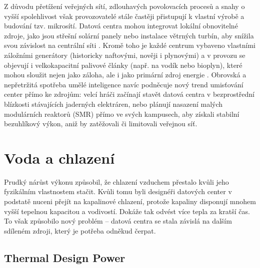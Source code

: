 Z důvodu přetížení veřejných sítí, zdlouhavých povolovacích procesů a snahy o vyšší spolehlivost však provozovatelé stále častěji přistupují k vlastní výrobě a budování tzv. mikrosítí. Datová centra mohou integrovat lokální obnovitelné zdroje, jako jsou střešní solární panely nebo instalace větrných turbín, aby snížila svou závislost na centrální síti \cite[91--93]{barroso_data_2026}. Kromě toho je každé centrum vybaveno vlastními záložními generátory (historicky naftovými, nověji i plynovými) a v provozu se objevují i velkokapacitní palivové články (např. na vodík nebo bioplyn), které mohou sloužit nejen jako záloha, ale i jako primární zdroj energie \cite{chen_electricity_2025}. Obrovská a nepřetržitá spotřeba umělé inteligence navíc podněcuje nový trend umisťování center přímo ke zdrojům: velcí hráči začínají stavět datová centra v bezprostřední blízkosti stávajících jaderných elektráren, nebo plánují nasazení malých modulárních reaktorů (SMR) přímo ve svých kampusech, aby získali stabilní bezuhlíkový výkon, aniž by zatěžovali či limitovali veřejnou síť. \cite{chen_electricity_2025, cruzes_data_2025, iea_energy_2025}


\section{Voda a chlazení}
\label{sec:chlazeni}


Prudký nárůst výkonu způsobil, že chlazení vzduchem přestalo kvůli jeho fyzikálním vlastnostem stačit. Kvůli tomu byli designéři datových center v podstatě nuceni přejít na kapalinové chlazení, protože kapaliny disponují mnohem vyšší tepelnou kapacitou a vodivostí. Dokáže tak odvést více tepla za kratší čas. To však způsobilo nový problém -- datová centra se stala závislá na dalším sdíleném zdroji, který je potřeba odněkud čerpat. 

\subsection{Thermal Design Power}
\label{sec:tdp}

